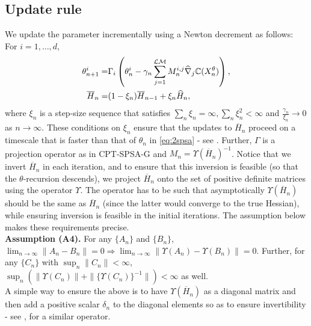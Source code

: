 \documentclass[11pt,letterpaper,english]{article}
\begin{document}
\subsection{Update rule}
We update the parameter incrementally using a Newton decrement as follows: For $i=1,\ldots,d$,
\begin{align}
\label{eq:2spsa}
\theta^{i}_{n+1} =& \Gamma_{i}\left(\theta^{i}_n - \gamma_n \sum_{j=1}^{\mathcal{L}\mathcal{M}} M_n^{i,j} \widehat \nabla_{j} \mathbb{C}(X^\theta_n)\right), \\
\overline H_n = & (1-\xi_n) \overline H_{n-1} + \xi_n \widehat H_n,\label{eq:2spsa-H}
\end{align}
where $\xi_n$ is a step-size sequence that satisfies 
$\sum_{n} \xi_n = \infty, \sum_n \xi_n^2 < \infty$ and $\frac{\gamma_n}{\xi_n}\rightarrow 0$ as $n\rightarrow \infty$. These conditions on $\xi_n$ ensure that the updates to $\overline H_n$ proceed on a timescale that is faster than that of $\theta_n$ in \eqref{eq:2spsa} - see \cite[Chapter 6]{borkar2008stochastic}.
Further, $\Gamma$ is a projection operator as in CPT-SPSA-G and  $M_n = \Upsilon(\overline H_n)^{-1}$.
Notice that we invert $\overline H_n$ in each iteration, and to ensure that this inversion is feasible (so that the $\theta$-recursion descends), we project $\overline H_n$ onto the set of positive definite matrices using the operator $\Upsilon$. The operator has to be such that asymptotically $\Upsilon(\overline H_n)$ should be the same as $\overline H_n$ (since the latter would converge to the true Hessian), while ensuring inversion is feasible in the initial iterations.  The assumption below makes these requirements precise.\\[1ex]
\textbf{Assumption (A4).}  For any $\{A_n\}$ and $\{B_n\}$,
${\displaystyle \lim_{n\rightarrow \infty} \left\| A_n-B_n \right\|}= 0 \Rightarrow {\displaystyle \lim_{n\rightarrow \infty} \parallel \Upsilon(A_n)- \Upsilon(B_n) \parallel}= 0$. Further, for any $\{C_n\}$  with
${\displaystyle \sup_n \parallel C_n\parallel}<\infty$,
${\displaystyle \sup_n \left(\parallel \Upsilon(C_n)\parallel + \parallel \{\Upsilon(C_n)\}^{-1} \parallel\right) < \infty}$
as well.
\\[0.5ex]
A simple way to ensure the above is to have $\Upsilon(\overline H_n)$ as a diagonal matrix and then add a positive scalar $\delta_n$ to the diagonal elements so as to ensure invertibility  - see \cite{gill1981practical}, \cite{spall2000adaptive} for a similar operator.
\end{document}
